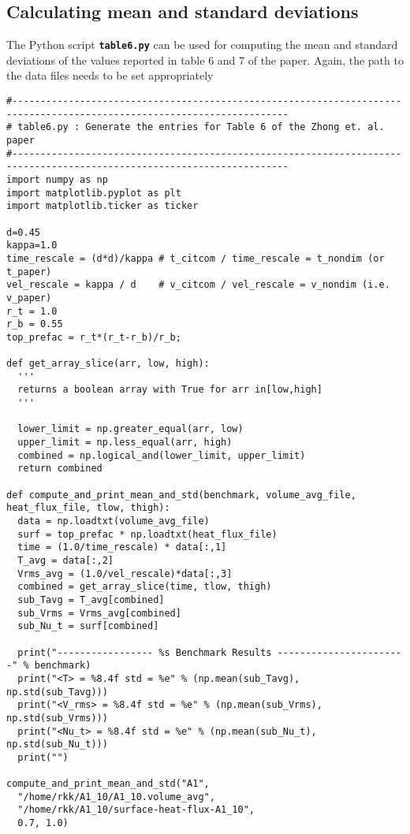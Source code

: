 \documentclass[10pt]{article}
\begin{document}
\subsection*{Calculating mean and standard deviations}
The Python script \textbf{\texttt{table6.py}} can be used for computing the mean and standard deviations of the
values reported in table 6 and 7 of the paper. Again, the path to the data files needs to be set appropriately
\begin{verbatim}
#-----------------------------------------------------------------------------------------------------------------------
# table6.py : Generate the entries for Table 6 of the Zhong et. al. paper
#-----------------------------------------------------------------------------------------------------------------------
import numpy as np
import matplotlib.pyplot as plt
import matplotlib.ticker as ticker

d=0.45
kappa=1.0
time_rescale = (d*d)/kappa # t_citcom / time_rescale = t_nondim (or t_paper) 
vel_rescale = kappa / d    # v_citcom / vel_rescale = v_nondim (i.e. v_paper)
r_t = 1.0
r_b = 0.55
top_prefac = r_t*(r_t-r_b)/r_b;

def get_array_slice(arr, low, high):
  '''
  returns a boolean array with True for arr in[low,high]
  '''

  lower_limit = np.greater_equal(arr, low)
  upper_limit = np.less_equal(arr, high)
  combined = np.logical_and(lower_limit, upper_limit)
  return combined

def compute_and_print_mean_and_std(benchmark, volume_avg_file, heat_flux_file, tlow, thigh):
  data = np.loadtxt(volume_avg_file)
  surf = top_prefac * np.loadtxt(heat_flux_file)
  time = (1.0/time_rescale) * data[:,1]
  T_avg = data[:,2]
  Vrms_avg = (1.0/vel_rescale)*data[:,3]
  combined = get_array_slice(time, tlow, thigh)
  sub_Tavg = T_avg[combined]
  sub_Vrms = Vrms_avg[combined]
  sub_Nu_t = surf[combined]

  print("----------------- %s Benchmark Results -----------------------" % benchmark)
  print("<T> = %8.4f std = %e" % (np.mean(sub_Tavg), np.std(sub_Tavg)))
  print("<V_rms> = %8.4f std = %e" % (np.mean(sub_Vrms), np.std(sub_Vrms)))
  print("<Nu_t> = %8.4f std = %e" % (np.mean(sub_Nu_t), np.std(sub_Nu_t)))
  print("")

compute_and_print_mean_and_std("A1", 
  "/home/rkk/A1_10/A1_10.volume_avg", 
  "/home/rkk/A1_10/surface-heat-flux-A1_10", 
  0.7, 1.0)
\end{verbatim}
\end{document}
